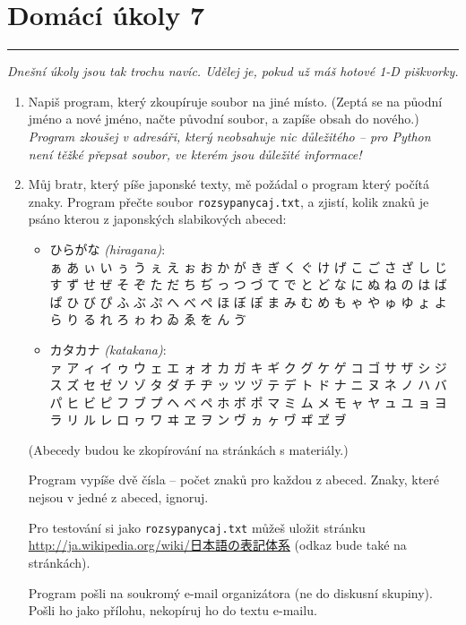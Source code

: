 \documentclass[a4paper,10pt]{article}
\newcommand\plsetno{7}
\newcommand\startsection[1]{
     \vspace{0.2ex}
    \hrule
    {\fontspec{Oxygen} \tiny
     \vspace{-1ex}
     \emph{#1}
     \vspace{-1.5em}
    }
}
\begin{document}
\section*{Domácí úkoly \plsetno}

\startsection{Dnešní úkoly jsou tak trochu navíc. Udělej je, pokud už máš hotové 1-D piškvorky.}

\begin{enumerate}[resume]

\item
    Napiš program, který zkoupíruje soubor na jiné místo.
    (Zeptá se na půodní jméno a nové jméno, načte původní soubor,
    a zapíše obsah do nového.)
    \\\emph{\small Program zkoušej v adresáři, který neobsahuje nic
        důležitého – pro Python není těžké přepsat soubor,
        ve kterém jsou důležité informace!}

\item
    Můj bratr, který píše japonské texty, mě požádal o program
    který počítá znaky.
    Program přečte soubor \verb+rozsypanycaj.txt+, a zjistí,
    kolik znaků je psáno kterou z japonských slabikových abeced:
    \begin{itemize}
    \item { ひらがな \emph{(hiragana)}:
        \\ ぁ あ ぃ い ぅ う ぇ え ぉ お か が き ぎ く
        ぐ け げ こ ご さ ざ し じ す ず せ ぜ そ ぞ た
        だ ち ぢ っ つ づ て で と ど な に ぬ ね の は
        ば ぱ ひ び ぴ ふ ぶ ぷ へ べ ぺ ほ ぼ ぽ ま み
        む め も ゃ や ゅ ゆ ょ よ ら り る れ ろ ゎ わ
        ゐ ゑ を ん ゔ}
    \item { カタカナ \emph{(katakana)}:
        \\ ァ ア ィ イ ゥ ウ ェ エ ォ オ カ ガ キ ギ ク
        グ ケ ゲ コ ゴ サ ザ シ ジ ス ズ セ ゼ ソ ゾ タ
        ダ チ ヂ ッ ツ ヅ テ デ ト ド ナ ニ ヌ ネ ノ ハ
        バ パ ヒ ビ ピ フ ブ プ ヘ ベ ペ ホ ボ ポ マ ミ
        ム メ モ ャ ヤ ュ ユ ョ ヨ ラ リ ル レ ロ ヮ ワ
        ヰ ヱ ヲ ン ヴ ヵ ヶ ヷ ヸ ヹ ヺ}
    \end{itemize}
    (Abecedy budou ke zkopírování na stránkách s materiály.)

    Program vypíše dvě čísla – počet znaků pro každou z abeced.
    Znaky, které nejsou v jedné z abeced, ignoruj.

    Pro testování si jako \verb+rozsypanycaj.txt+ můžeš uložit stránku
    \href{http://ja.wikipedia.org/wiki/%E6%97%A5%E6%9C%AC%E8%AA%9E%E3%81%AE%E8%A1%A8%E8%A8%98%E4%BD%93%E7%B3%BB}{
        http://ja.wikipedia.org/wiki/{日本語の表記体系}}
    (odkaz bude také na stránkách).

    Program pošli na soukromý e-mail organizátora (ne do diskusní skupiny).
    Pošli ho jako přílohu, nekopíruj ho do textu e-mailu.

\end{enumerate}
\end{document}
